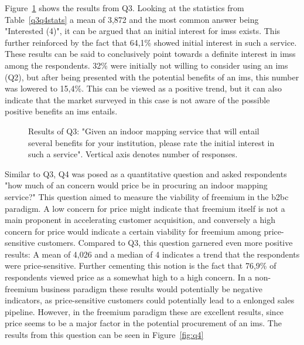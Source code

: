 Figure~\ref{fig:q3} shows the results from Q3. Looking at the statistics from Table~\ref{q3q4stats} a mean of 3,872 and the most common answer being "Interested (4)", it can be argued that an initial interest for \glspl{ims} exists. This further reinforced by the fact that 64,1\% showed initial interest in such a service. These results can be said to conclusively point towards a definite interest in \glspl{ims} among the respondents. 32\% were initially not willing to consider using an \gls{ims} (Q2), but after being presented with the potential benefits of an \gls{ims}, this number was lowered to 15,4\%. This can be viewed as a positive trend, but it can also indicate that the market surveyed in this case is not aware of the possible positive benefits an \gls{ims} entails.


\begin{figure}
    \centering
    \caption{Results of Q3: "Given an indoor mapping service that will entail several benefits for your institution, please rate the initial interest in such a service". Vertical axis denotes number of responses.}
    \label{fig:q3}
\end{figure}



Similar to Q3, Q4 was posed as a quantitative question and asked respondents "how much of an concern would price be in procuring an indoor mapping service?" This question aimed to measure the viability of freemium in the \gls{b2bc} paradigm. A low concern for price might indicate that freemium itself is not a main proponent in accelerating customer acquisition, and conversely a high concern for price would indicate a certain viability for freemium among price-sensitive customers. Compared to Q3, this question garnered even more positive results: A mean of 4,026 and a median of 4 indicates a trend that the respondents were price-sensitive. Further cementing this notion is the fact that 76,9\% of respondents viewed price as a somewhat high to a high concern. In a non-freemium business paradigm these results would potentially be negative indicators, as price-sensitive customers could potentially lead to a enlonged sales pipeline. However, in the freemium paradigm these are excellent results, since price seems to be a major factor in the potential procurement of an \gls{ims}. The results from this question can be seen in Figure~\ref{fig:q4}



